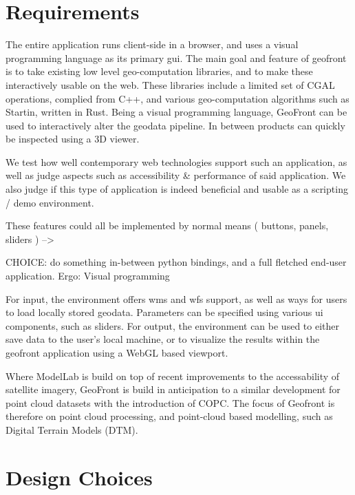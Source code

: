 \section{ Requirements }


The entire application runs client-side in a browser, and uses a visual programming language as its primary \ac{gui}.
The main goal and feature of geofront is to take existing low level geo-computation libraries, and to make these interactively usable on the web. 
These libraries include a limited set of CGAL operations, complied from C++, and various geo-computation algorithms such as Startin, written in Rust. 
Being a visual programming language, GeoFront can be used to interactively alter the geodata pipeline. 
In between products can quickly be inspected using a 3D viewer.

We test how well contemporary web technologies support such an application, as well as judge aspects such as accessibility \& performance of said application. We also judge if this type of application is indeed beneficial and usable as a scripting / demo environment.  

These features could all be implemented by normal means ( buttons, panels, sliders ) -->

CHOICE: do something in-between python bindings, and a full fletched end-user application. 
Ergo: Visual programming

For input, the environment offers \ac{wms} and \ac{wfs} support, as well as ways for users to load locally stored geodata. Parameters can be specified using various ui components, such as sliders. 
For output, the environment can be used to either save data to the user's local machine, or to visualize the results within the geofront application using a WebGL based viewport.

Where ModelLab is build on top of recent improvements to the accessability of satellite imagery, GeoFront is build in anticipation to a similar development for point cloud datasets with the introduction of COPC. The focus of Geofront is therefore on point cloud processing, and point-cloud based modelling, such as Digital Terrain Models (DTM). 


\section{ Design Choices }


